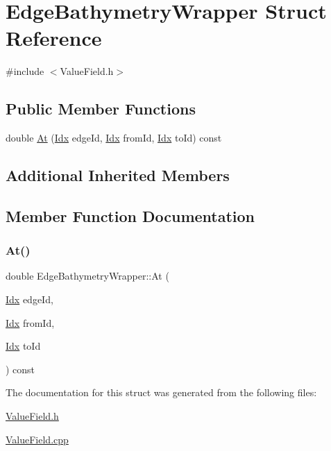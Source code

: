 \hypertarget{structEdgeBathymetryWrapper}{}\section{Edge\+Bathymetry\+Wrapper Struct Reference}
\label{structEdgeBathymetryWrapper}


{\ttfamily \#include $<$Value\+Field.\+h$>$}

\subsection*{Public Member Functions}
\begin{DoxyCompactItemize}
\item 
double \hyperlink{structEdgeBathymetryWrapper_a1d5dd9ce4e41330cee57cdd5786e5176}{At} (\hyperlink{Includes_8h_ae78891cd308078a2f5f9e7193065c805}{Idx} edge\+Id, \hyperlink{Includes_8h_ae78891cd308078a2f5f9e7193065c805}{Idx} from\+Id, \hyperlink{Includes_8h_ae78891cd308078a2f5f9e7193065c805}{Idx} to\+Id) const
\end{DoxyCompactItemize}
\subsection*{Additional Inherited Members}


\subsection{Member Function Documentation}
\mbox{\label{structEdgeBathymetryWrapper_a1d5dd9ce4e41330cee57cdd5786e5176}} 
\subsubsection{\texorpdfstring{At()}{At()}}
{\footnotesize\ttfamily double Edge\+Bathymetry\+Wrapper\+::\+At (\begin{DoxyParamCaption}\item[{\hyperlink{Includes_8h_ae78891cd308078a2f5f9e7193065c805}{Idx}}]{edge\+Id,  }\item[{\hyperlink{Includes_8h_ae78891cd308078a2f5f9e7193065c805}{Idx}}]{from\+Id,  }\item[{\hyperlink{Includes_8h_ae78891cd308078a2f5f9e7193065c805}{Idx}}]{to\+Id }\end{DoxyParamCaption}) const}



The documentation for this struct was generated from the following files\+:\begin{DoxyCompactItemize}
\item 
\hyperlink{ValueField_8h}{Value\+Field.\+h}\item 
\hyperlink{ValueField_8cpp}{Value\+Field.\+cpp}\end{DoxyCompactItemize}
